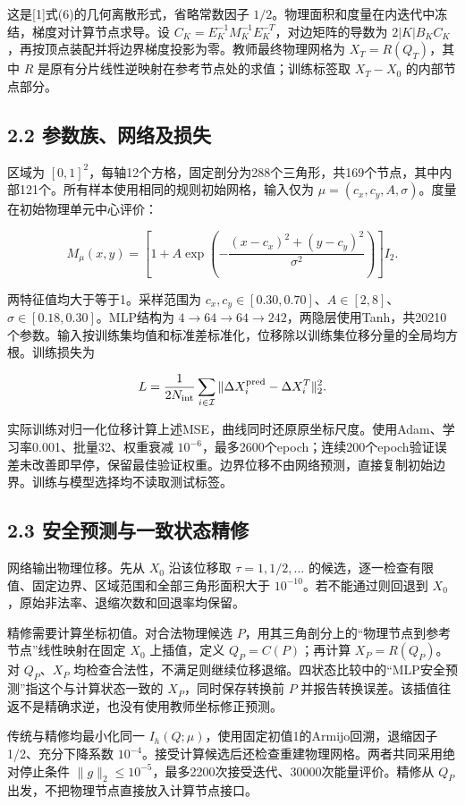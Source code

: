 \documentclass[UTF8,a4paper,zihao=5,fontset=fandol]{ctexart}
\begin{document}
这是[1]式(6)的几何离散形式，省略常数因子 $1/2$。物理面积和度量在内迭代中冻结，梯度对计算节点求导。设 $C_K=E_K^{-1}M_K^{-1}E_K^{-T}$，对边矩阵的导数为 $2|K|B_KC_K$，再按顶点装配并将边界梯度投影为零。教师最终物理网格为 $X_T=R(Q_T)$，其中 $R$ 是原有分片线性逆映射在参考节点处的求值；训练标签取 $X_T-X_0$ 的内部节点部分。


\newpage

\subsection*{2.2 参数族、网络及损失}

区域为 $[0,1]^2$，每轴12个方格，固定剖分为288个三角形，共169个节点，其中内部121个。所有样本使用相同的规则初始网格，输入仅为 $\mu=(c_x,c_y,A,\sigma)$。度量在初始物理单元中心评价：


\[
M_\mu(x,y)=\left[1+A\exp\left(-\frac{(x-c_x)^2+(y-c_y)^2}{\sigma^2}\right)\right]I_2.
\]

两特征值均大于等于1。采样范围为 $c_x,c_y\in[0.30,0.70]$、$A\in[2,8]$、$\sigma\in[0.18,0.30]$。MLP结构为 $4\to64\to64\to242$，两隐层使用Tanh，共20210个参数。输入按训练集均值和标准差标准化，位移除以训练集位移分量的全局均方根。训练损失为


\[
L=\frac{1}{2N_{\rm int}}\sum_{i\in\mathcal I}\|\Delta X_i^{\rm pred}-\Delta X_i^T\|_2^2.
\]

实际训练对归一化位移计算上述MSE，曲线同时还原原坐标尺度。使用Adam、学习率0.001、批量32、权重衰减 $10^{-6}$，最多2600个epoch；连续200个epoch验证误差未改善即早停，保留最佳验证权重。边界位移不由网络预测，直接复制初始边界。训练与模型选择均不读取测试标签。


\subsection*{2.3 安全预测与一致状态精修}

网络输出物理位移。先从 $X_0$ 沿该位移取 $\tau=1,1/2,\ldots$ 的候选，逐一检查有限值、固定边界、区域范围和全部三角形面积大于 $10^{-10}$。若不能通过则回退到 $X_0$，原始非法率、退缩次数和回退率均保留。


精修需要计算坐标初值。对合法物理候选 $P$，用其三角剖分上的“物理节点到参考节点”线性映射在固定 $X_0$ 上插值，定义 $Q_P=C(P)$；再计算 $X_P=R(Q_P)$。对 $Q_P$、$X_P$ 均检查合法性，不满足则继续位移退缩。四状态比较中的“MLP安全预测”指这个与计算状态一致的 $X_P$，同时保存转换前 $P$ 并报告转换误差。该插值往返不是精确求逆，也没有使用教师坐标修正预测。


传统与精修均最小化同一 $I_h(Q;\mu)$，使用固定初值1的Armijo回溯，退缩因子1/2、充分下降系数 $10^{-4}$。接受计算候选后还检查重建物理网格。两者共同采用绝对停止条件 $\|g\|_2\le10^{-5}$，最多2200次接受迭代、30000次能量评价。精修从 $Q_P$ 出发，不把物理节点直接放入计算节点接口。
\end{document}

